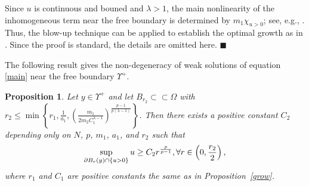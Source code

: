 \documentclass[onecolumn]{autart}
\newtheorem{proposition}{Proposition}
\newenvironment{proof}{{\it Proof: \enspace}}{\hfill $\blacksquare$\par}
\begin{document}
	\begin{proof}
		Since $u$ is continuous and bouned and $\lambda>1$, the main nonlinearity of the inhomogeneous  term near the free boundary is determined  by   $m_1\chi_{u>0}$; see, e.g., \cite{Hu:2025}. Thus, the   blow-up technique can be applied to establish the optimal growth  as in \cite{Karp:2000,Challal:2009,Hu:2025,Zheng:2013}. Since the proof is standard,   the details are  omitted here.
	\end{proof}
	
	The following result gives the non-degeneracy of weak solutions of  equation \eqref{main} near the free boundary $\Upsilon^+$.
	
	\begin{proposition}\label{nondegeneracy}
		Let $y \in \Upsilon^+$ and let $B_{r_2} \subset\subset \Omega$ with $	r_2 \leq \min\left\{r_1, \frac{1}{a_1} , \left(\frac{m_1}{2m_2 C_1^{\lambda-1}}\right)^{\frac{p-1}{p(\lambda-1)}}\right\}$. Then there exists a positive constant $C_2$ depending only on $N$, $p$, $m_1$, $a_1$, and $r_2$ such that
		\begin{align}
			\sup_{\partial B_r(y) \cap \{u > 0\}} u \geq C_2 r^{\frac{p}{p-1}},\forall r \in \left( 0, \frac{r_2}{2}\right) ,\notag
		\end{align}
		where $r_1$ and $C_1$ are positive constants the same as in Proposition~\ref{grow}.
	\end{proposition}
	
\end{document}

